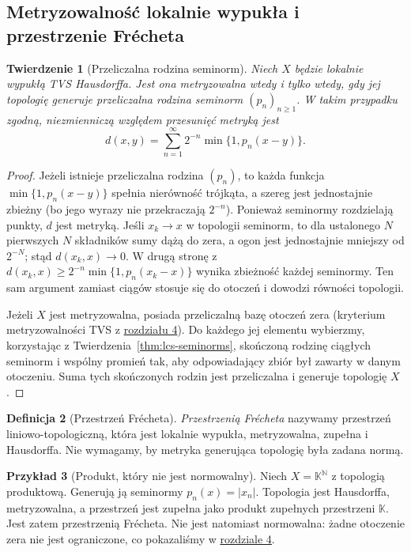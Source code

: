 \documentclass[11pt,a4paper]{article}
\numberwithin{equation}{section}
\theoremstyle{plain}
\newtheorem{twierdzenie}{Twierdzenie}[section]
\theoremstyle{definition}
\newtheorem{definicja}[twierdzenie]{Definicja}
\newtheorem{przyklad}[twierdzenie]{Przykład}
\theoremstyle{remark}
\newcommand{\N}{\mathbb N}
\newcommand{\K}{\mathbb K}
\begin{document}
\subsection{Metryzowalność lokalnie wypukła i przestrzenie Frécheta}

\begin{twierdzenie}[Przeliczalna rodzina seminorm]
\label{thm:countable-seminorms}
Niech $X$ będzie lokalnie wypukłą TVS Hausdorffa.
Jest ona metryzowalna wtedy i tylko wtedy, gdy jej topologię
generuje przeliczalna rodzina seminorm $(p_n)_{n\ge1}$.
W takim przypadku zgodną, niezmienniczą względem przesunięć
metryką jest
\[
 d(x,y)=\sum_{n=1}^{\infty}2^{-n}\min\{1,p_n(x-y)\}.
\]
\end{twierdzenie}
\begin{proof}
Jeżeli istnieje przeliczalna rodzina $(p_n)$,
to każda funkcja $\min\{1,p_n(x-y)\}$ spełnia
nierówność trójkąta, a szereg jest jednostajnie zbieżny
(bo jego wyrazy nie przekraczają $2^{-n}$).
Ponieważ seminormy rozdzielają punkty, $d$ jest metryką.
Jeśli $x_k\to x$ w topologii seminorm, to dla ustalonego
$N$ pierwszych $N$ składników sumy dążą do zera,
a ogon jest jednostajnie mniejszy od $2^{-N}$;
stąd $d(x_k,x)\to0$. W drugą stronę z
$d(x_k,x)\ge2^{-n}\min\{1,p_n(x_k-x)\}$
wynika zbieżność każdej seminormy. Ten sam argument
zamiast ciągów stosuje się do otoczeń i dowodzi
równości topologii.

Jeżeli $X$ jest metryzowalna, posiada przeliczalną bazę
otoczeń zera (kryterium metryzowalności TVS z \hyperref[sec:rodziny-metryzowalnosc]{rozdziału 4}).
Do każdego jej elementu wybierzmy, korzystając z
Twierdzenia~\ref{thm:lcs-seminorms}, skończoną rodzinę
ciągłych seminorm i wspólny promień tak, aby odpowiadający
zbiór był zawarty w danym otoczeniu. Suma tych skończonych
rodzin jest przeliczalna i generuje topologię $X$.
\end{proof}

\begin{definicja}[Przestrzeń Frécheta]
\label{def:frechet-space}
\emph{Przestrzenią Frécheta} nazywamy przestrzeń
liniowo-topologiczną, która jest lokalnie wypukła,
metryzowalna, zupełna i Hausdorffa. Nie wymagamy, by
metryka generująca topologię była zadana normą.
\end{definicja}

\begin{przyklad}[Produkt, który nie jest normowalny]
\label{ex:product-lcs}
Niech $X=\K^{\N}$ z topologią produktową.
Generują ją seminormy $p_n(x)=|x_n|$.
Topologia jest Hausdorffa, metryzowalna, a przestrzeń
jest zupełna jako produkt zupełnych przestrzeni $\K$.
Jest zatem przestrzenią Frécheta. Nie jest natomiast
normowalna: żadne otoczenie zera nie jest ograniczone,
co pokazaliśmy w \hyperref[sec:rodziny-metryzowalnosc]{rozdziale 4}.
\end{przyklad}
\end{document}
